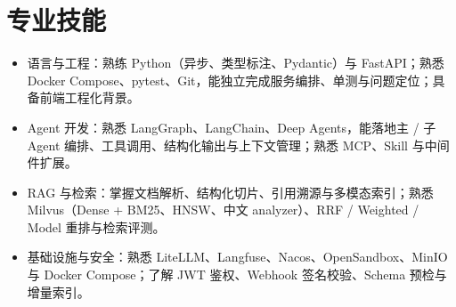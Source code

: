\documentclass{resume-photo}
\begin{document}
\section{专业技能}
\begin{itemize}
  \item 语言与工程：熟练 Python（异步、类型标注、Pydantic）与 FastAPI；熟悉 Docker Compose、pytest、Git，能独立完成服务编排、单测与问题定位；具备前端工程化背景。
  \item Agent 开发：熟悉 LangGraph、LangChain、Deep Agents，能落地主 / 子 Agent 编排、工具调用、结构化输出与上下文管理；熟悉 MCP、Skill 与中间件扩展。
  \item RAG 与检索：掌握文档解析、结构化切片、引用溯源与多模态索引；熟悉 Milvus（Dense + BM25、HNSW、中文 analyzer）、RRF / Weighted / Model 重排与检索评测。
  \item 基础设施与安全：熟悉 LiteLLM、Langfuse、Nacos、OpenSandbox、MinIO 与 Docker Compose；了解 JWT 鉴权、Webhook 签名校验、Schema 预检与增量索引。
\end{itemize}
\end{document}

